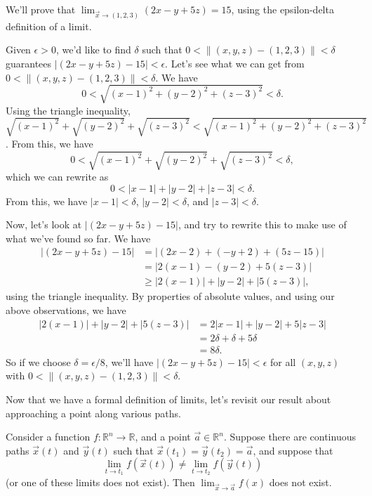 \documentclass{ximera}
\begin{document}
\begin{example}
We'll prove that $\lim_{\vec{x}\rightarrow (1,2,3)} (2x-y+5z) = 15$, using the epsilon-delta definition of a limit.

Given $\epsilon >0$, we'd like to find $\delta$ such that $0< \|(x,y,z)-(1,2,3)\|<\delta$ guarantees $|(2x-y+5z)-15|<\epsilon$. Let's see what we can get from $0< \|(x,y,z)-(1,2,3)\|<\delta$. We have
\[
0< \sqrt{(x-1)^2+(y-2)^2+(z-3)^2}<\delta.
\]
Using the triangle inequality, $\sqrt{(x-1)^2}+\sqrt{(y-2)^2}+\sqrt{(z-3)^2} < \sqrt{(x-1)^2+(y-2)^2+(z-3)^2}$. From this, we have
\[
0< \sqrt{(x-1)^2}+\sqrt{(y-2)^2}+\sqrt{(z-3)^2}<\delta,
\]
which we can rewrite as
\[
0< |x-1|+|y-2|+|z-3|<\delta.
\]
From this, we have $|x-1|<\delta$, $|y-2|<\delta$, and $|z-3|<\delta$.

Now, let's look at $|(2x-y+5z)-15|$, and try to rewrite this to make use of what we've found so far. We have
\begin{align*}
 |(2x-y+5z)-15| &=|(2x-2)+(-y+2)+(5z-15)|\\
&=|2(x-1)-(y-2)+5(z-3)|\\
&\geq |2(x-1)|+|y-2|+|5(z-3)|,
\end{align*}
using the triangle inequality. By properties of absolute values, and using our above observations, we have
\begin{align*}
|2(x-1)|+|y-2|+|5(z-3)| &= 2|x-1|+|y-2|+5|z-3|\\
&=2\delta + \delta + 5\delta\\
&=8\delta.
\end{align*}
So if we choose $\delta = \epsilon/8$, we'll have $|(2x-y+5z)-15|<\epsilon$ for all $(x,y,z)$ with $0< \|(x,y,z)-(1,2,3)\|<\delta$.
\end{example}

Now that we have a formal definition of limits, let's revisit our result about approaching a point along various paths.

\begin{proposition}
Consider a function $f:\mathbb{R}^n\rightarrow \mathbb{R}$, and a point $\vec{a}\in\mathbb{R}^n$. Suppose there are continuous paths $\vec{x}(t)$ and $\vec{y}(t)$ such that $\vec{x}(t_1) = \vec{y}(t_2) = \vec{a}$, and suppose that
\[
\lim_{t\rightarrow t_1}f(\vec{x}(t))\neq \lim_{t\rightarrow t_2}f(\vec{y}(t))
\]
(or one of these limits does not exist). Then $\lim_{\vec{x}\rightarrow\vec{a}}f(x)$ does not exist.
\end{proposition}
\end{document}
